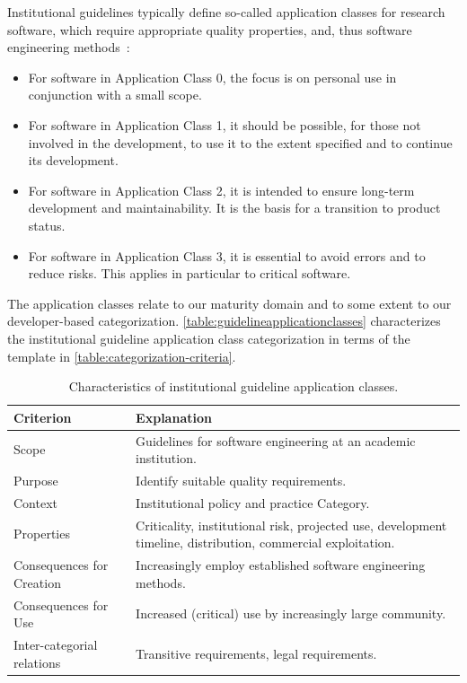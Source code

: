 \documentclass{IEEEcsmag}
\newcommand{\ieeeitem}{\item[{\ieeeguilsinglright}]}
\begin{document}
Institutional guidelines typically define so-called application classes for research software, which require appropriate quality properties, and, thus software engineering methods~\cite{DLR2018,FZJ2022}:
\begin{itemize}
    \ieeeitem For software in Application Class 0, the focus is on personal use in conjunction with a small scope.
    \ieeeitem For software in Application Class 1, it should be possible, for those not involved in the development, to use
it to the extent specified and to continue its development.
	  \ieeeitem For software in Application Class 2, it is intended to ensure long-term development and maintainability. It is
the basis for a transition to product status.
		\ieeeitem For software in Application Class 3, it is essential to avoid errors and to reduce risks. This applies in particular
to critical software.
\end{itemize}
The application classes relate to our maturity domain and to some extent to our developer-based categorization.
\autoref{table:guidelineapplicationclasses} characterizes the institutional guideline application class categorization in terms of the template in \autoref{table:categorization-criteria}.

\begin{table}[bt]
    \centering
    \begin{tabularx}{\textwidth}{l X}
    \toprule
        Criterion & Explanation \\
    \midrule
        Scope & Guidelines for software engineering at an academic institution. \\
        Purpose & Identify suitable quality requirements.\\
        Context & Institutional policy and practice Category. \\
        Properties & Criticality, institutional risk, projected use, development timeline, distribution, commercial exploitation. \\
        Consequences for Creation & Increasingly employ established software engineering methods.\\
        Consequences for Use & Increased (critical) use by increasingly large community. \\
        Inter-categorial relations & Transitive requirements, legal requirements.\\
    \bottomrule
    \end{tabularx}
    \caption{Characteristics of institutional guideline application classes.}
    \label{table:guidelineapplicationclasses}
\end{table}
\end{document}
